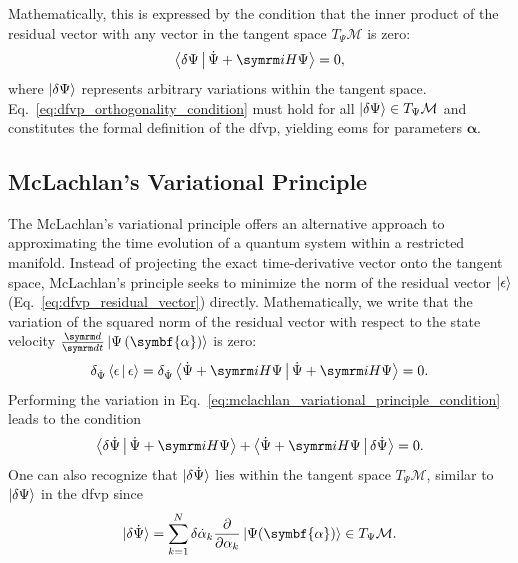 Mathematically, this is expressed by the condition that the inner product of the residual vector with any vector in the tangent space $T_{\Psi}\mathcal{M}$ is zero:
\begin{equation}\label{eq:dfvp_orthogonality_condition}
\Braket{\delta\Psi|\dot\Psi+\i H\Psi}=0,
\end{equation}
where $\ket{\delta\Psi}$ represents arbitrary variations within the tangent space. Eq.~\eqref{eq:dfvp_orthogonality_condition} must hold for all $\ket{\delta\Psi}\in T_{\Psi}\mathcal{M}$ and constitutes the formal definition of the \gls{dfvp}, yielding \glspl{eom} for parameters $\symbf{\alpha}$.
\subsection{McLachlan's Variational Principle}\label{sec:mclachlan_variational_principle}
The McLachlan's variational principle offers an alternative approach to approximating the time evolution of a quantum system within a restricted manifold. Instead of projecting the exact time-derivative vector onto the tangent space, McLachlan's principle seeks to minimize the norm of the residual vector $\ket{\epsilon}$ (Eq.~\eqref{eq:dfvp_residual_vector}) directly.\supercite{10.1080/00268976400100041} Mathematically, we write that the variation of the squared norm of the residual vector with respect to the state velocity $\ddt\ket{\Psi\left(\symbf{\alpha}\right)}$ is zero:
\begin{equation}\label{eq:mclachlan_variational_principle_condition}
\delta_{\dot\Psi}\Braket{\epsilon|\epsilon}=\delta_{\dot\Psi}\Braket{\dot\Psi+\i H\Psi|\dot\Psi+\i H\Psi}=0.
\end{equation}
Performing the variation in Eq.~\eqref{eq:mclachlan_variational_principle_condition} leads to the condition
\begin{equation}\label{eq:mclachlan_variational_principle_intermediate}
\Braket{\delta\dot\Psi|\dot\Psi+\i H\Psi}+\Braket{\dot\Psi+\i H\Psi|\delta\dot\Psi}=0.
\end{equation}
One can also recognize that $\ket{\delta\dot\Psi}$ lies within the tangent space $T_{\Psi}\mathcal{M}$, similar to $\ket{\delta\Psi}$ in the \gls{dfvp} since
\begin{equation}\label{eq:tangent_variation_equality}
\ket{\delta\dot\Psi}=\sum_{k=1}^N\delta\dot{\alpha}_k\frac{\partial}{\partial\alpha_k}\ket{\Psi(\symbf{\alpha})}\in T_{\Psi}\mathcal{M}.
\end{equation}
